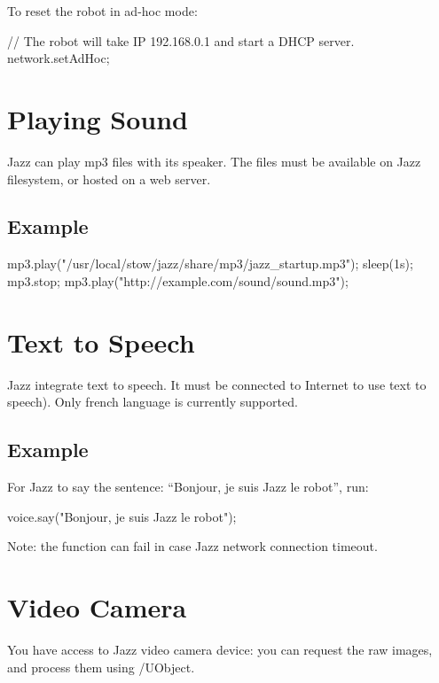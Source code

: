 To reset the robot in ad-hoc mode:

\begin{urbiunchecked}
// The robot will take IP 192.168.0.1 and start a DHCP server.
network.setAdHoc;
\end{urbiunchecked}

\section{Playing Sound}

Jazz can play mp3 files with its speaker. The files must be available on
Jazz filesystem, or hosted on a web server.

\subsection{Example}

\begin{urbiunchecked}
mp3.play("/usr/local/stow/jazz/share/mp3/jazz_startup.mp3");
sleep(1s);
mp3.stop;
mp3.play("http://example.com/sound/sound.mp3");
\end{urbiunchecked}

\section{Text to Speech}

Jazz integrate text to speech. It must be connected to Internet to use
text to speech).  Only french language is currently supported.

\subsection{Example}

For Jazz to say the sentence: ``Bonjour, je suis Jazz le robot'', run:

\begin{urbiunchecked}
voice.say("Bonjour, je suis Jazz le robot");
\end{urbiunchecked}

Note: the function can fail in case Jazz network connection timeout.

\section{Video Camera}

You have access to Jazz video camera device: you can request the raw
images, and process them using \us/UObject.

